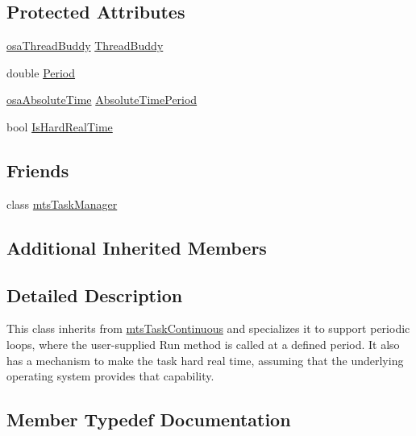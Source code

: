 \subsection*{Protected Attributes}
\begin{DoxyCompactItemize}
\item 
\hyperlink{classosa_thread_buddy}{osa\+Thread\+Buddy} \hyperlink{classmts_task_periodic_a8658fffa3b56f91a7853c20bd622c069}{Thread\+Buddy}
\item 
double \hyperlink{classmts_task_periodic_a8453eaab96a98c048192d7511f263988}{Period}
\item 
\hyperlink{structosa_absolute_time}{osa\+Absolute\+Time} \hyperlink{classmts_task_periodic_a1e5e04be2039534dd19d645be4e7da60}{Absolute\+Time\+Period}
\item 
bool \hyperlink{classmts_task_periodic_a84c05c06ebc6938d0c7ee007ea41a470}{Is\+Hard\+Real\+Time}
\end{DoxyCompactItemize}
\subsection*{Friends}
\begin{DoxyCompactItemize}
\item 
class \hyperlink{classmts_task_periodic_a21d47396ed8d4c10b5acd6a083b219f9}{mts\+Task\+Manager}
\end{DoxyCompactItemize}
\subsection*{Additional Inherited Members}


\subsection{Detailed Description}
This class inherits from \hyperlink{classmts_task_continuous}{mts\+Task\+Continuous} and specializes it to support periodic loops, where the user-\/supplied Run method is called at a defined period. It also has a mechanism to make the task hard real time, assuming that the underlying operating system provides that capability. 

\subsection{Member Typedef Documentation}
\hypertarget{classmts_task_periodic_ae0e61abd9d99d5c58d97bfd2401ebd6e}{}

